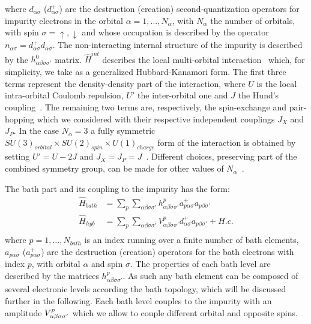 \documentclass[final,3p,10pt]{elsarticle}
\def\a{\alpha}       \def\b{\beta}   \def\g{\gamma}   \def\d{\delta}
\def\up{\uparrow} \def\down{\downarrow} \def\dw{\downarrow}
\begin{document}
where $d_{\a\sigma}$ ($d^+_{\a\sigma}$) are the destruction (creation)
second-quantization operators for impurity electrons in the
orbital $\alpha=1,\dots,N_\a$, with $N_\a$ the number of orbitals,
with spin $\sigma=\up,\dw$ and whose occupation is described
by the  operator  
$n_{\alpha\sigma}=d^{+}_{\alpha\sigma}d_{\alpha\sigma}$. 
The non-interacting internal structure of the impurity is described by
the $h^{0}_{\a\b\sigma\sigma'}$ matrix. 
$\hat{H}^{int}$ describes the  local multi-orbital
interaction~\cite{Georges2013ACMP} which, for simplicity, we take as a
generalized Hubbard-Kanamori form.  
The first three terms represent the density-density part of the
interaction, where $U$ is the local intra-orbital Coulomb repulsion,
$U'$ the inter-orbital one and $J$ the Hund's coupling~\cite{Georges2013ACMP}.  
The  remaining two terms are, respectively, the spin-exchange and
pair-hopping which we considered with their respective independent
couplings $J_X$ and $J_P$.
In the case $N_\a=3$ a fully symmetric $SU(3)_{orbital}\times SU(2)_{spin}\times
U(1)_{charge}$ form of the interaction is obtained by setting $U'=U-2J$ and
$J_X=J_P=J$~\cite{Georges2013ACMP}. Different choices, preserving part
of the combined symmetry group, can be made for other values of
$N_\a$~\cite{Georges2013ACMP}. 


The bath part and its coupling to the impurity has the form: 
\begin{equation}\label{Hbath}
  \begin{split}
    \hat{H}_{bath} &=
    \sum_p\sum_{\a\b\sigma\sigma'}h^p_{\a\b\sigma\sigma'}a^{+}_{p\a\sigma}a_{p\b\sigma'}\\
    \hat{H}_{hyb} &= \sum_p\sum_{\a\b\sigma\sigma'}V^p_{\a\b\sigma\sigma'}d^{+}_{\a\sigma}a_{p\b\sigma'}+H.c. \\
\end{split}
\end{equation}
where $p=1,\dots,N_{bath}$ is an index running over a finite number of
bath elements, $a_{p\alpha\sigma}$ ($a^+_{p\alpha\sigma}$) are the destruction (creation) operators for
the bath electrons with index $p$, with orbital $\alpha$ and
spin $\sigma$.
The  properties of each bath level are described by the
matrices $h^p_{\a\b\sigma\sigma'}$. As such any bath element can be
composed of several electronic levels according the bath topology,
which will be discussed further in the following.
Each bath level couples to the impurity with an amplitude
$V^p_{\a\b\s\sigma'}$ which we allow to couple different orbital and
opposite spins.   
\end{document}
